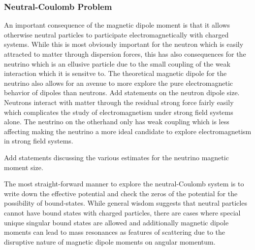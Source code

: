 \subsubsection{Neutral-Coulomb Problem}\label{ajsss:neutral}
\noindent An important consequence of the magnetic dipole moment is that it allows otherwise neutral particles to participate electromagnetically with charged systems. While this is most obviously important for the neutron which is easily attracted to matter through dispersion forces, this has also consequences for the neutrino which is an ellusive particle due to the small coupling of the weak interaction which it is sensitve to. The theoretical magnetic dipole for the neutrino also allows for an avenue to more explore the pure electromagnetic behavior of dipoles than neutrons. {\color{red}Add statements on the neutron dipole size.} Neutrons interact with matter through the residual strong force fairly easily which complicates the study of electromagnetism under strong field systems alone. The neutrino on the otherhand only has weak coupling which is less affecting making the neutrino a more ideal candidate to explore electromagnetism in strong field systems.

{\color{red}Add statements discussing the various estimates for the neutrino magnetic moment size.}

The most straight-forward manner to explore the neutral-Coulomb system is to write down the effective potential and check the zeros of the potential for the possibility of bound-states. While general wisdom suggests that neutral particles cannot have bound states with charged particles, there are cases where special unique singular bound states are allowed and additionally magnetic dipole moments can lead to mass resonances as features of scattering due to the disruptive nature of magnetic dipole moments on angular momentum.

